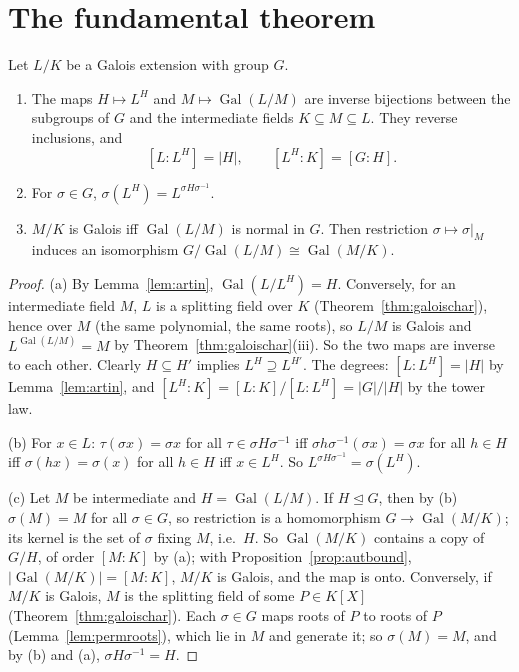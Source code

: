 \section{The fundamental theorem}

\begin{theorem}\label{thm:ftgt}
Let $L/K$ be a Galois extension with group $G$.
\begin{enumerate}[label=(\alph*)]
\item The maps $H\mapsto L^H$ and $M\mapsto\operatorname{Gal}(L/M)$ are inverse bijections between the subgroups of $G$ and the intermediate fields $K\subseteq M\subseteq L$. They reverse inclusions, and
\[
[L:L^H]=|H|,\qquad[L^H:K]=[G:H].
\]
\item For $\sigma\in G$, $\sigma(L^H)=L^{\sigma H\sigma^{-1}}$.
\item $M/K$ is Galois iff $\operatorname{Gal}(L/M)$ is normal in $G$. Then restriction $\sigma\mapsto\sigma|_M$ induces an isomorphism $G/\operatorname{Gal}(L/M)\cong\operatorname{Gal}(M/K)$.
\end{enumerate}
\end{theorem}
\begin{proof}
(a) By Lemma~\ref{lem:artin}, $\operatorname{Gal}(L/L^H)=H$. Conversely, for an intermediate field $M$, $L$ is a splitting field over $K$ (Theorem~\ref{thm:galoischar}), hence over $M$ (the same polynomial, the same roots), so $L/M$ is Galois and $L^{\operatorname{Gal}(L/M)}=M$ by Theorem~\ref{thm:galoischar}(iii). So the two maps are inverse to each other. Clearly $H\subseteq H'$ implies $L^H\supseteq L^{H'}$. The degrees: $[L:L^H]=|H|$ by Lemma~\ref{lem:artin}, and $[L^H:K]=[L:K]/[L:L^H]=|G|/|H|$ by the tower law.

(b) For $x\in L$: $\tau(\sigma x)=\sigma x$ for all $\tau\in\sigma H\sigma^{-1}$ iff $\sigma h\sigma^{-1}(\sigma x)=\sigma x$ for all $h\in H$ iff $\sigma(hx)=\sigma(x)$ for all $h\in H$ iff $x\in L^H$. So $L^{\sigma H\sigma^{-1}}=\sigma(L^H)$.

(c) Let $M$ be intermediate and $H=\operatorname{Gal}(L/M)$. If $H\trianglelefteq G$, then by (b) $\sigma(M)=M$ for all $\sigma\in G$, so restriction is a homomorphism $G\to\operatorname{Gal}(M/K)$; its kernel is the set of $\sigma$ fixing $M$, i.e.\ $H$. So $\operatorname{Gal}(M/K)$ contains a copy of $G/H$, of order $[M:K]$ by (a); with Proposition~\ref{prop:autbound}, $|\operatorname{Gal}(M/K)|=[M:K]$, $M/K$ is Galois, and the map is onto. Conversely, if $M/K$ is Galois, $M$ is the splitting field of some $P\in K[X]$ (Theorem~\ref{thm:galoischar}). Each $\sigma\in G$ maps roots of $P$ to roots of $P$ (Lemma~\ref{lem:permroots}), which lie in $M$ and generate it; so $\sigma(M)=M$, and by (b) and (a), $\sigma H\sigma^{-1}=H$.
\end{proof}

